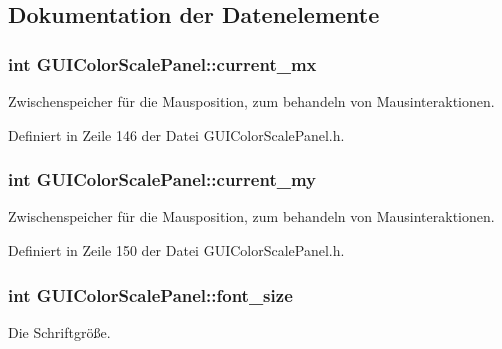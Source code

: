 \subsection{Dokumentation der Datenelemente}
\hypertarget{classGUIColorScalePanel_ab3da81e6c3cfb9122c0291584276a54d}{
\subsubsection[{current\-\_\-mx}]{\setlength{\rightskip}{0pt plus 5cm}int G\-U\-I\-Color\-Scale\-Panel\-::current\-\_\-mx\hspace{0.3cm}{\ttfamily [private]}}}\label{classGUIColorScalePanel_ab3da81e6c3cfb9122c0291584276a54d}
Zwischenspeicher für die Mausposition, zum behandeln von Mausinteraktionen. 

Definiert in Zeile 146 der Datei G\-U\-I\-Color\-Scale\-Panel.\-h.

\hypertarget{classGUIColorScalePanel_abb73679c805d8bcdd1ca0cb602887f84}{
\subsubsection[{current\-\_\-my}]{\setlength{\rightskip}{0pt plus 5cm}int G\-U\-I\-Color\-Scale\-Panel\-::current\-\_\-my\hspace{0.3cm}{\ttfamily [private]}}}\label{classGUIColorScalePanel_abb73679c805d8bcdd1ca0cb602887f84}
Zwischenspeicher für die Mausposition, zum behandeln von Mausinteraktionen. 

Definiert in Zeile 150 der Datei G\-U\-I\-Color\-Scale\-Panel.\-h.

\hypertarget{classGUIColorScalePanel_acd79c1dedc939040b03f54f21e78d72f}{
\subsubsection[{font\-\_\-size}]{\setlength{\rightskip}{0pt plus 5cm}int G\-U\-I\-Color\-Scale\-Panel\-::font\-\_\-size\hspace{0.3cm}{\ttfamily [private]}}}\label{classGUIColorScalePanel_acd79c1dedc939040b03f54f21e78d72f}
Die Schriftgröße. 

